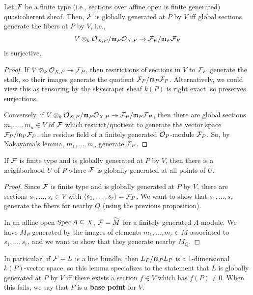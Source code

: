 \documentclass[12pt]{article}
\begin{document}
\begin{prop}
    Let $\mathcal{F}$ be a finite type (i.e., sections over affine open is finite generated) quasicoherent sheaf. Then, $\mathcal{F}$ is globally generated at $P$ by $V$ iff global sections generate the fibers at $P$ by $V$, i.e.,
    \[V \otimes_k \mathcal{O}_{X,P}/\mathfrak{m}_P\mathcal{O}_{X,P} \to \mathcal{F}_P/\mathfrak{m}_P\mathcal{F}_P\]
    is surjective.
\end{prop}
\begin{proof}
    If $V \otimes_k \mathcal{O}_{X,P} \twoheadrightarrow \mathcal{F}_P$, then restrictions of sections in $V$ to $\mathcal{F}_P$ generate the stalk, so their images generate the quotient $\mathcal{F}_P/\mathfrak{m}_P \mathcal{F}_P$. Alternatively, we could view this as tensoring by the skyscraper sheaf $k(P)$ is right exact, so preserves surjections.

    Conversely, if $V \otimes_k \mathcal{O}_{X,P}/\mathfrak{m}_P \mathcal{O}_{X,P} \twoheadrightarrow \mathcal{F}_P/\mathfrak{m}_P \mathcal{F}_P$, then there are global sections $m_1,\dots,m_n\in V$ of $\mathcal{F}$ which restrict/quotient to generate the vector space $\mathcal{F}_P/\mathfrak{m}_P \mathcal{F}_P$, the residue field of a finitely generated $\mathcal{O}_P$-module $\mathcal{F}_P$. So, by Nakayama's lemma, $m_1,\dots,m_n$ generate $\mathcal{F}_P$.
\end{proof}

\begin{prop}
    If $\mathcal{F}$ is finite type and is globally generated at $P$ by $V$, then there is a neighborhood $U$ of $P$ where $\mathcal{F}$ is globally generated at all points of $U$.
\end{prop}

\begin{proof}
    Since $\mathcal{F}$ is finite type and is globally generated at $P$ by $V$, there are sections $s_1,\dots,s_r \in V$ with $\left\langle s_1,\dots,s_r\right\rangle=\mathcal{F}_P$. We want to show that $s_1,\dots,s_r$ generate the fibers for nearby $Q$ (using the previous proposition).

    In an affine open $\operatorname{Spec} A \subseteq X$, $\mathcal{F} =\widetilde{M}$ for a finitely generated $A$-module. We have $M_P$ generated by the images of elements $m_1,\dots,m_r\in M$ associated to $s_1,\dots,s_r$, and we want to show that they generate nearby $M_Q$. 
\end{proof}

In particular, if $\mathcal{F} = L$ is a line bundle, then $L_P/\mathfrak{m}_P L_P$ is a 1-dimensional $k(P)$-vector space, so this lemma specializes to the statement that $L$ is globally generated at $P$ by $V$ iff there exists a section $f\in V$ which has $f(P)\neq 0$. When this fails, we say that $P$ is a \textbf{base point} for $V$.
\end{document}
